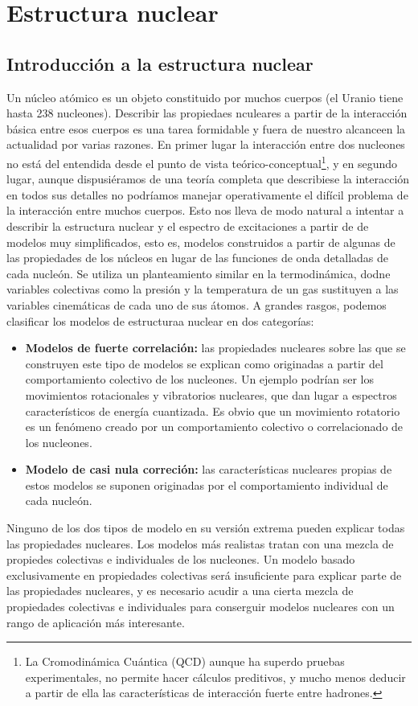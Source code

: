 \chapter{Estructura nuclear} \label{Ch:03}

\section{Introducción a la estructura nuclear}

Un núcleo atómico es un objeto constituido por muchos cuerpos (el Uranio tiene hasta 238 nucleones). Describir las propiedaes nculeares a partir de la interacción básica entre esos cuerpos es una tarea formidable y fuera de nuestro alcanceen la actualidad por varias razones. En primer lugar la interacción entre dos nucleones no está del entendida desde el punto de vista teórico-conceptual\footnote{La Cromodinámica Cuántica (QCD) aunque ha superdo pruebas experimentales, no permite hacer cálculos preditivos, y mucho menos deducir a partir de ella las características de interacción fuerte entre hadrones.}, y en segundo lugar, aunque dispusiéramos de una teoría completa que describiese la interacción en todos sus detalles no podríamos manejar operativamente el difícil problema de la interacción entre muchos cuerpos. Esto nos lleva de modo natural a intentar a describir la estructura nuclear y el espectro de excitaciones a partir de de modelos muy simplificados, esto es, modelos construidos a partir de algunas de las propiedades de los núcleos en lugar de las funciones de onda detalladas de cada nucleón. Se utiliza un planteamiento similar en la termodinámica, dodne variables colectivas como la presión y la temperatura de un gas sustituyen a las variables cinemáticas de cada uno de sus átomos. A grandes rasgos, podemos clasificar los modelos de estructuraa nuclear en dos categorías:

\begin{itemize}
    \item \textbf{Modelos de fuerte correlación:} las propiedades nucleares sobre las que se construyen este tipo de modelos se explican como originadas a partir del comportamiento colectivo de los nucleones. Un ejemplo podrían ser los movimientos rotacionales y vibratorios nucleares, que dan lugar a espectros característicos de energía cuantizada. Es obvio que un movimiento rotatorio es un fenómeno creado por un comportamiento colectivo o correlacionado de los nucleones.
    \item \textbf{Modelo de casi nula correción:} las características nucleares propias de estos modelos se suponen originadas por el comportamiento individual de cada nucleón.
\end{itemize}
Ninguno de los dos tipos de modelo en su versión extrema pueden explicar todas las propiedades nucleares. Los modelos más realistas tratan con una mezcla de propiedes colectivas e individuales de los nucleones. Un modelo basado exclusivamente en propiedades colectivas será insuficiente para explicar parte de las propiedades nucleares, y es necesario acudir a una cierta mezcla de propiedades colectivas e individuales para conserguir modelos nucleares con un rango de aplicación más interesante.

